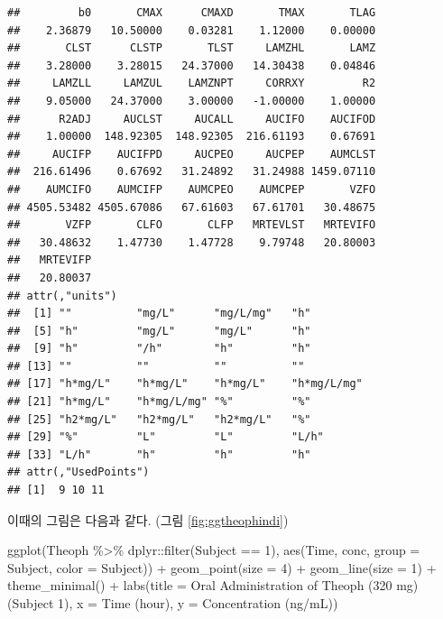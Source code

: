 \documentclass[
  11pt,
  krantz2, a4paper, twoside]{krantz}
\newenvironment{Shaded}{\begin{snugshade}}{\end{snugshade}}
\newcommand{\AttributeTok}[1]{\textcolor[rgb]{0.77,0.63,0.00}{#1}}
\newcommand{\DecValTok}[1]{\textcolor[rgb]{0.00,0.00,0.81}{#1}}
\newcommand{\FunctionTok}[1]{\textcolor[rgb]{0.00,0.00,0.00}{#1}}
\newcommand{\NormalTok}[1]{#1}
\newcommand{\SpecialCharTok}[1]{\textcolor[rgb]{0.00,0.00,0.00}{#1}}
\newcommand{\StringTok}[1]{\textcolor[rgb]{0.31,0.60,0.02}{#1}}
\theoremstyle{definition}
\theoremstyle{definition}
\theoremstyle{definition}
\theoremstyle{definition}
\theoremstyle{remark}
\begin{document}
\begin{verbatim}
##         b0       CMAX      CMAXD       TMAX       TLAG 
##    2.36879   10.50000    0.03281    1.12000    0.00000 
##       CLST      CLSTP       TLST     LAMZHL       LAMZ 
##    3.28000    3.28015   24.37000   14.30438    0.04846 
##     LAMZLL     LAMZUL    LAMZNPT     CORRXY         R2 
##    9.05000   24.37000    3.00000   -1.00000    1.00000 
##      R2ADJ     AUCLST     AUCALL     AUCIFO    AUCIFOD 
##    1.00000  148.92305  148.92305  216.61193    0.67691 
##     AUCIFP    AUCIFPD     AUCPEO     AUCPEP    AUMCLST 
##  216.61496    0.67692   31.24892   31.24988 1459.07110 
##    AUMCIFO    AUMCIFP    AUMCPEO    AUMCPEP       VZFO 
## 4505.53482 4505.67086   67.61603   67.61701   30.48675 
##       VZFP       CLFO       CLFP   MRTEVLST   MRTEVIFO 
##   30.48632    1.47730    1.47728    9.79748   20.80003 
##   MRTEVIFP 
##   20.80037 
## attr(,"units")
##  [1] ""          "mg/L"      "mg/L/mg"   "h"        
##  [5] "h"         "mg/L"      "mg/L"      "h"        
##  [9] "h"         "/h"        "h"         "h"        
## [13] ""          ""          ""          ""         
## [17] "h*mg/L"    "h*mg/L"    "h*mg/L"    "h*mg/L/mg"
## [21] "h*mg/L"    "h*mg/L/mg" "%"         "%"        
## [25] "h2*mg/L"   "h2*mg/L"   "h2*mg/L"   "%"        
## [29] "%"         "L"         "L"         "L/h"      
## [33] "L/h"       "h"         "h"         "h"        
## attr(,"UsedPoints")
## [1]  9 10 11
\end{verbatim}

이때의 그림은 다음과 같다. (그림 \ref{fig:ggtheophindi})

\begin{Shaded}
\begin{Highlighting}[]
\FunctionTok{ggplot}\NormalTok{(Theoph }\SpecialCharTok{\%\textgreater{}\%}\NormalTok{ dplyr}\SpecialCharTok{::}\FunctionTok{filter}\NormalTok{(Subject }\SpecialCharTok{==} \DecValTok{1}\NormalTok{), }
       \FunctionTok{aes}\NormalTok{(Time, conc, }\AttributeTok{group =}\NormalTok{ Subject, }\AttributeTok{color =}\NormalTok{ Subject)) }\SpecialCharTok{+}
  \FunctionTok{geom\_point}\NormalTok{(}\AttributeTok{size =} \DecValTok{4}\NormalTok{) }\SpecialCharTok{+} \FunctionTok{geom\_line}\NormalTok{(}\AttributeTok{size =} \DecValTok{1}\NormalTok{) }\SpecialCharTok{+}
  \FunctionTok{theme\_minimal}\NormalTok{() }\SpecialCharTok{+}
  \FunctionTok{labs}\NormalTok{(}\AttributeTok{title =} \StringTok{\textquotesingle{}Oral Administration of Theoph (320 mg) (Subject 1)\textquotesingle{}}\NormalTok{,}
       \AttributeTok{x =} \StringTok{\textquotesingle{}Time (hour)\textquotesingle{}}\NormalTok{, }\AttributeTok{y =} \StringTok{\textquotesingle{}Concentration (ng/mL)\textquotesingle{}}\NormalTok{)}
\end{Highlighting}
\end{Shaded}
\end{document}
